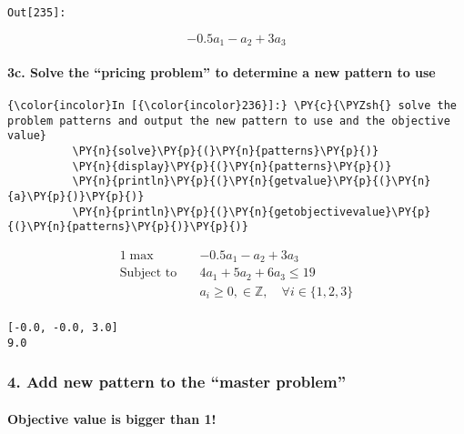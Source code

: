 \texttt{\color{outcolor}Out[{\color{outcolor}235}]:}
    
    $$ -0.5 a_{1} - a_{2} + 3 a_{3} $$

    

    \hypertarget{c.-solve-the-pricing-problem-to-determine-a-new-pattern-to-use}{%
\paragraph{3c. Solve the ``pricing problem'' to determine a new
pattern to
use}\label{c.-solve-the-pricing-problem-to-determine-a-new-pattern-to-use}}

    \begin{Verbatim}[commandchars=\\\{\}]
{\color{incolor}In [{\color{incolor}236}]:} \PY{c}{\PYZsh{} solve the problem patterns and output the new pattern to use and the objective value}
          \PY{n}{solve}\PY{p}{(}\PY{n}{patterns}\PY{p}{)}
          \PY{n}{display}\PY{p}{(}\PY{n}{patterns}\PY{p}{)}
          \PY{n}{println}\PY{p}{(}\PY{n}{getvalue}\PY{p}{(}\PY{n}{a}\PY{p}{)}\PY{p}{)}
          \PY{n}{println}\PY{p}{(}\PY{n}{getobjectivevalue}\PY{p}{(}\PY{n}{patterns}\PY{p}{)}\PY{p}{)}
\end{Verbatim}


\begin{equation} \begin{split}{1}\max\quad & -0.5 a_{1} - a_{2} + 3 a_{3}\\
\text{Subject to} \quad & 4 a_{1} + 5 a_{2} + 6 a_{3} \leq 19\\
 & a_{i} \geq 0, \in \mathbb{Z}, \quad\forall i \in \{1,2,3\}\\
\end{split}
\end{equation}

    
    \begin{Verbatim}[commandchars=\\\{\}]
[-0.0, -0.0, 3.0]
9.0

    \end{Verbatim}

    \hypertarget{add-new-pattern-to-the-master-problem}{%
\subsubsection{4. Add new pattern to the ``master
problem''}\label{add-new-pattern-to-the-master-problem}}

\hypertarget{objective-value-is-bigger-than-1}{%
\paragraph{Objective value is bigger than
1!}\label{objective-value-is-bigger-than-1}}

